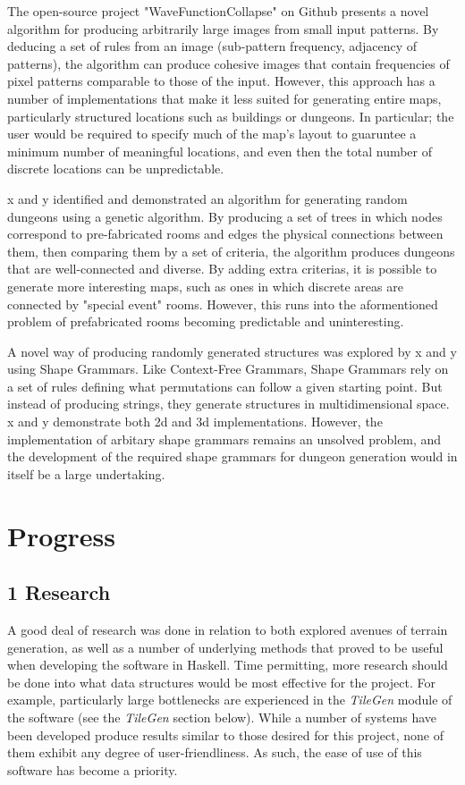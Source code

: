 \documentclass{article}
\begin{document}
The open-source project "WaveFunctionCollapse" on Github presents a novel algorithm for producing arbitrarily large images from small input patterns. By deducing a set of rules from an image (sub-pattern frequency, adjacency of patterns), the algorithm can produce cohesive images that contain frequencies of pixel patterns comparable to those of the input. However, this approach has a number of implementations that make it less suited for generating entire maps, particularly structured locations such as buildings or dungeons. In particular; the user would be required to specify much of the map's layout to guaruntee a minimum number of meaningful locations, and even then the total number of discrete locations can be unpredictable.



x and y identified and demonstrated an algorithm for generating random dungeons using a genetic algorithm. By producing a set of trees in which nodes correspond to pre-fabricated rooms and edges the physical connections between them, then comparing them by a set of criteria, the algorithm produces dungeons that are well-connected and diverse. By adding extra criterias, it is possible to generate more interesting maps, such as ones in which discrete areas are connected by "special event" rooms. However, this runs into the aformentioned problem of prefabricated rooms becoming predictable and uninteresting. 



A novel way of producing randomly generated structures was explored by x and y using Shape Grammars. Like Context-Free Grammars, Shape Grammars rely on a set of rules defining what permutations can follow a given starting point. But instead of producing strings, they generate structures in multidimensional space. x and y demonstrate both 2d and 3d implementations. However, the implementation of arbitary shape grammars remains an unsolved problem, and the development of the required shape grammars for dungeon generation would in itself be a large undertaking.

\section{Progress}

\subsection{1 Research}
A good deal of research was done in relation to both explored avenues of terrain generation, as well as a number of underlying methods that proved to be useful when developing the software in Haskell. Time permitting, more research should be done into what data structures would be most effective for the project. For example, particularly large bottlenecks are experienced in the \textit{TileGen} module of the software (see the \textit{TileGen} section below). While a number of systems have been developed produce results similar to those desired for this project, none of them exhibit any degree of user-friendliness. As such, the ease of use of this software has become a priority.
\end{document}
